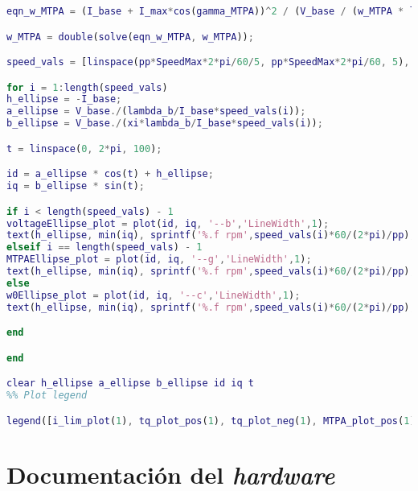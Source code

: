 \begin{lstlisting}[language=Matlab, basicstyle=\ttfamily\small, breaklines=true, frame=single]
eqn_w_MTPA = (I_base + I_max*cos(gamma_MTPA))^2 / (V_base / (w_MTPA * lambda_b / I_base))^2 + (I_max*sin(gamma_MTPA))^2 / (V_base / (xi * w_MTPA * lambda_b / I_base))^2 - 1;

w_MTPA = double(solve(eqn_w_MTPA, w_MTPA));

speed_vals = [linspace(pp*SpeedMax*2*pi/60/5, pp*SpeedMax*2*pi/60, 5), w_MTPA(w_MTPA>0), w_base]; % speed values

for i = 1:length(speed_vals)
h_ellipse = -I_base;
a_ellipse = V_base./(lambda_b/I_base*speed_vals(i));
b_ellipse = V_base./(xi*lambda_b/I_base*speed_vals(i));

t = linspace(0, 2*pi, 100);

id = a_ellipse * cos(t) + h_ellipse;
iq = b_ellipse * sin(t);

if i < length(speed_vals) - 1
voltageEllipse_plot = plot(id, iq, '--b','LineWidth',1);
text(h_ellipse, min(iq), sprintf('%.f rpm',speed_vals(i)*60/(2*pi)/pp),'Color','blue','FontSize',12);
elseif i == length(speed_vals) - 1
MTPAEllipse_plot = plot(id, iq, '--g','LineWidth',1);
text(h_ellipse, min(iq), sprintf('%.f rpm',speed_vals(i)*60/(2*pi)/pp),'Color','green','FontSize',12);
else
w0Ellipse_plot = plot(id, iq, '--c','LineWidth',1);
text(h_ellipse, min(iq), sprintf('%.f rpm',speed_vals(i)*60/(2*pi)/pp),'Color','cyan','FontSize',12);

end

end

clear h_ellipse a_ellipse b_ellipse id iq t 
%% Plot legend

legend([i_lim_plot(1), tq_plot_pos(1), tq_plot_neg(1), MTPA_plot_pos(1), MTPA_plot_neg(1), voltageEllipse_plot(1), MTPAEllipse_plot(1), w0Ellipse_plot(1)], 'Current limit [A]', 'Torque curves (traction) [Nm]', 'Torque curves (regen) [Nm]', 'MTPA hyperbola (traction)', 'MTPA hyperbola (regen)', 'Voltage limit ellipses [rpm, mechanical]', 'MTPA speed point ellipse [rpm, mechanical]', 'MTPA speed limit ellipse [rpm, mechanical]')
\end{lstlisting}

\chapter{Documentación del \textit{hardware}}
